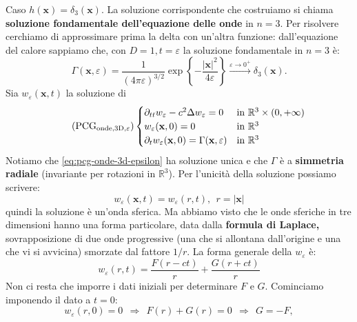 \documentclass[10pt,a4paper,twoside,openright]{book}
\newcommand{\x}{\mathbf{x}}
\begin{document}
Caso $\displaystyle h(\x) =\delta _{3}(\x)$. La soluzione corrispondente che costruiamo si chiama \textbf{soluzione fondamentale dell'equazione delle onde} in $n=3$. Per risolvere cerchiamo di approssimare prima la delta con un'altra funzione: dall'equazione del calore sappiamo che, con $\displaystyle D=1,t=\varepsilon $ la soluzione fondamentale in $n=3$ è:
\begin{equation*}
    \Gamma (\x ,\varepsilon) =\frac{1}{(4\pi \varepsilon)^{3/2}}\exp\left\{-\frac{| \x| ^{2}}{4\varepsilon }\right\}\xrightarrow{\varepsilon \rightarrow 0^{+}} \delta _{3}(\x) .
\end{equation*}
Sia $\displaystyle w_{\varepsilon }(\x ,t)$ la soluzione di
\begin{equation*}
    \tag{PCG$_{\text{onde,3D},\varepsilon}$}
    \begin{cases}
        \partial _{tt} w_{\varepsilon } -c^{2} \Delta w_{\varepsilon } =0 & \text{in} \ \mathbb{R}^{3} \times (0,+\infty) \\
        w_{\varepsilon }(\x ,0) =0                                        & \text{in} \ \mathbb{R}^{3}                    \\
        \partial _{t} w_{\varepsilon }(\x ,0) =\Gamma (\x ,\varepsilon)   & \text{in} \ \mathbb{R}^{3}
    \end{cases}
    \label{eq:pcg-onde-3d-epsilon}
\end{equation*}
Notiamo che \eqref{eq:pcg-onde-3d-epsilon} ha soluzione unica e che $\displaystyle \Gamma $ è a \textbf{simmetria radiale} (invariante per rotazioni in $\displaystyle \mathbb{R}^{3}$). Per l'unicità della soluzione possiamo scrivere:
\begin{equation*}
    w_{\varepsilon }(\x ,t) =w_{\varepsilon }(r,t) ,\ \ r=| \x|
\end{equation*}
quindi la soluzione è un'onda sferica. Ma abbiamo visto che le onde sferiche in tre dimensioni hanno una forma particolare, data dalla \textbf{formula di Laplace, }sovrapposizione di due onde progressive (una che si allontana dall'origine e una che vi si avvicina) smorzate dal fattore $1/r$. La forma generale della $\displaystyle w_{\varepsilon }$ è:
\begin{equation*}
    w_{\varepsilon }(r,t) =\frac{F(r-ct)}{r} +\frac{G(r+ct)}{r}
\end{equation*}
Non ci resta che imporre i dati iniziali per determinare $F$ e $G$. Cominciamo imponendo il dato a $t=0$:
\begin{equation*}
    w_{\varepsilon }(r,0) =0\ \ \Rightarrow \ \ F(r) +G(r) =0\ \ \Rightarrow \ \ G=-F,
\end{equation*}
\end{document}
